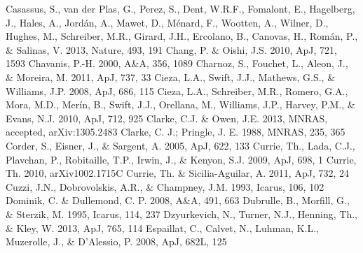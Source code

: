 \documentclass[apj]{emulateapj}
\begin{document}
\begin{thebibliography}{}
 Casassus, S., van der Plas, G., Perez, S., Dent, W.R.F., Fomalont, E., Hagelberg, J., Hales, A., Jord\'an, A., Mawet, D., M\'enard, F., Wootten, A., Wilner, D., Hughes, M., Schreiber, M.R., Girard, J.H., Ercolano, B., Canovas, H., Rom\'an, P., \& Salinas, V. 2013, Nature, 493, 191
 Chang, P. \& Oishi, J.S. 2010, ApJ, 721, 1593
 Chavanis, P.-H. 2000, A\&A, 356, 1089
 Charnoz, S., Fouchet, L., Aleon, J., \& Moreira, M. 2011, ApJ, 737, 33
 Cieza, L.A., Swift, J.J., Mathews, G.S., \& Williams, J.P. 2008, ApJ, 686, 115
 Cieza, L.A., Schreiber, M.R., Romero, G.A., Mora, M.D., Mer\'in, B., Swift, J.J., Orellana, M., Williams, J.P., Harvey, P.M., \& Evans, N.J. 2010, ApJ, 712, 925
 Clarke, C.J. \& Owen, J.E. 2013, MNRAS, accepted, arXiv:1305.2483
 Clarke, C. J.; Pringle, J. E. 1988, MNRAS, 235, 365
 Corder, S., Eisner, J., \& Sargent, A. 2005, ApJ, 622, 133
 Currie, Th., Lada, C.J., Plavchan, P.,  Robitaille, T.P., Irwin, J., \& Kenyon, S.J. 2009, ApJ, 698, 1
 Currie, Th. 2010, arXiv1002.1715C	
 Currie, Th. \& Sicilia-Aguilar, A. 2011, ApJ, 732, 24
 Cuzzi, J.N., Dobrovolskis, A.R., \& Champney, J.M. 1993, Icarus, 106, 102
 Dominik, C. \& Dullemond, C. P. 2008, A\&A, 491, 663
 Dubrulle, B., Morfill, G., \& Sterzik, M. 1995, Icarus, 114, 237
 Dzyurkevich, N., Turner, N.J., Henning, Th., \& Kley, W. 2013, ApJ, 765, 114
 Espaillat, C., Calvet, N., Luhman, K.L., Muzerolle, J., \& D'Alessio, P. 2008, ApJ, 682L, 125

\end{thebibliography}
\end{document}
